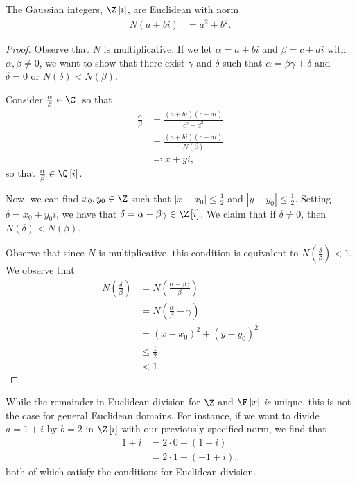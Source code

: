 \documentclass[10pt]{mypackage}
\begin{document}
\begin{theorem}
  The Gaussian integers, $\Z\left[ i \right]$, are Euclidean with norm
  \begin{align*}
    N\left(a + bi\right) &= a^2 + b^2.
  \end{align*}
\end{theorem}
\begin{proof}
  Observe that $N$ is multiplicative. If we let $\alpha = a + bi$ and $\beta = c + di$ with $\alpha,\beta\neq 0$, we want to show that there exist $\gamma$ and $\delta$ such that $\alpha = \beta \gamma + \delta$ and $\delta = 0$ or $N(\delta) < N(\beta)$.\newline

  Consider $\frac{\alpha}{\beta}\in \C$, so that
  \begin{align*}
    \frac{\alpha}{\beta} &= \frac{\left( a + bi \right)\left( c - di \right)}{c^2 + d^2}\\
                         &= \frac{\left( a + bi \right)\left( c -di \right)}{N(\beta)}\\
                         &\eqcolon x + yi,
  \end{align*}
  so that $ \frac{\alpha}{\beta}\in \Q\left[ i \right] $.\newline

  Now, we can find $x_0,y_0\in \Z$ such that $\left\vert x-x_0 \right\vert\leq \frac{1}{2}$ and $\left\vert y-y_0 \right\vert\leq \frac{1}{2}$. Setting $\delta = x_0 + y_0 i$, we have that $\delta = \alpha - \beta\gamma\in \Z\left[ i \right]$. We claim that if $\delta \neq 0$, then $N(\delta) < N(\beta)$.\newline

  Observe that since $N$ is multiplicative, this condition is equivalent to $N\left( \frac{\delta}{\beta} \right) < 1$. We observe that
  \begin{align*}
    N\left( \frac{\delta}{\beta} \right) &= N\left( \frac{\alpha - \beta \gamma}{\beta} \right)\\
                                         &= N\left( \frac{\alpha}{\beta} - \gamma \right)\\
                                         &= \left( x-x_0 \right)^2 + \left( y-y_0 \right)^2\\
                                         &\leq \frac{1}{2}\\
                                         &< 1.
  \end{align*}
\end{proof}
\begin{remark}
  While the remainder in Euclidean division for $\Z$ and $\F\left[ x \right]$ \textit{is} unique, this is not the case for general Euclidean domains. For instance, if we want to divide $a = 1 + i$ by $b = 2$ in $\Z\left[ i \right]$ with our previously specified norm, we find that 
  \begin{align*}
    1 + i &= 2\cdot 0 + \left( 1 + i \right) \\
          &= 2\cdot 1 + \left( -1 + i \right),
  \end{align*}
  both of which satisfy the conditions for Euclidean division.
\end{remark}
\end{document}
